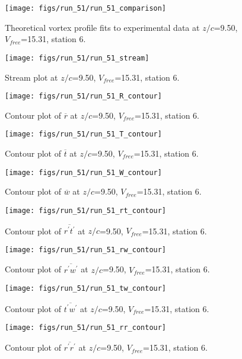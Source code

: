 \begin{figure}[H]
\centering
\texttt{[image: figs/run\_51/run\_51\_comparison]}
\caption{Theoretical vortex profile fits to experimental data at $z/c$=9.50, $V_{free}$=15.31, station 6.}
\end{figure}


\begin{figure}[H]
\centering
\texttt{[image: figs/run\_51/run\_51\_stream]}
\caption{Stream plot at $z/c$=9.50, $V_{free}$=15.31, station 6.}
\end{figure}


\begin{figure}[H]
\centering
\texttt{[image: figs/run\_51/run\_51\_R\_contour]}
\caption{Contour plot of $\overline{r}$ at $z/c$=9.50, $V_{free}$=15.31, station 6.}
\end{figure}


\begin{figure}[H]
\centering
\texttt{[image: figs/run\_51/run\_51\_T\_contour]}
\caption{Contour plot of $\overline{t}$ at $z/c$=9.50, $V_{free}$=15.31, station 6.}
\end{figure}


\begin{figure}[H]
\centering
\texttt{[image: figs/run\_51/run\_51\_W\_contour]}
\caption{Contour plot of $\overline{w}$ at $z/c$=9.50, $V_{free}$=15.31, station 6.}
\end{figure}


\begin{figure}[H]
\centering
\texttt{[image: figs/run\_51/run\_51\_rt\_contour]}
\caption{Contour plot of $\overline{r^\prime t^\prime}$ at $z/c$=9.50, $V_{free}$=15.31, station 6.}
\end{figure}


\begin{figure}[H]
\centering
\texttt{[image: figs/run\_51/run\_51\_rw\_contour]}
\caption{Contour plot of $\overline{r^\prime w^\prime}$ at $z/c$=9.50, $V_{free}$=15.31, station 6.}
\end{figure}


\begin{figure}[H]
\centering
\texttt{[image: figs/run\_51/run\_51\_tw\_contour]}
\caption{Contour plot of $\overline{t^\prime w^\prime}$ at $z/c$=9.50, $V_{free}$=15.31, station 6.}
\end{figure}


\begin{figure}[H]
\centering
\texttt{[image: figs/run\_51/run\_51\_rr\_contour]}
\caption{Contour plot of $\overline{r^\prime r^\prime}$ at $z/c$=9.50, $V_{free}$=15.31, station 6.}
\end{figure}


